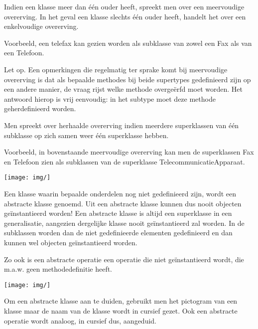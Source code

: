 Indien een klasse meer dan één ouder heeft, spreekt men over een meervoudige overerving. In het geval een klasse slechts één ouder heeft, handelt het over een enkelvoudige overerving.

Voorbeeld, een telefax kan gezien worden als subklasse van zowel een Fax als van een Telefoon.

Let op. Een opmerkingen die regelmatig ter sprake komt bij meervoudige overerving is dat als bepaalde methodes bij beide supertypes gedefinieerd zijn op een andere manier, de vraag rijst welke methode overgeërfd moet worden. Het antwoord hierop is vrij eenvoudig: in het subtype moet deze methode geherdefinieerd worden.

Men spreekt over herhaalde overerving indien meerdere superklassen van één subklasse op zich samen weer één superklasse hebben.

Voorbeeld, in bovenstaande meervoudige overerving kan men de superklassen Fax en Telefoon zien als subklassen van de superklasse TelecommunicatieApparaat.


\begin{center}
\texttt{[image: img/]}%
\label{labelname}%
\end{center}


Een klasse waarin bepaalde onderdelen nog niet gedefinieerd zijn, wordt een abstracte klasse genoemd. Uit een abstracte klasse kunnen dus nooit objecten geïnstantieerd worden!
Een abstracte klasse is altijd een superklasse in een generalisatie, aangezien dergelijke klasse nooit geïnstantieerd zal worden. In de subklassen worden dan de niet gedefinieerde elementen gedefinieerd en dan kunnen wel objecten geïnstantieerd worden.

Zo ook is een abstracte operatie een operatie die niet geïnstantieerd wordt, die m.a.w. geen methodedefinitie heeft.


\begin{center}
\texttt{[image: img/]}%
\label{labelname}%
\end{center}

Om een abstracte klasse aan te duiden, gebruikt men het pictogram van een klasse maar de naam van de klasse wordt in cursief gezet. Ook een abstracte operatie wordt analoog, in cursief dus, aangeduid.

